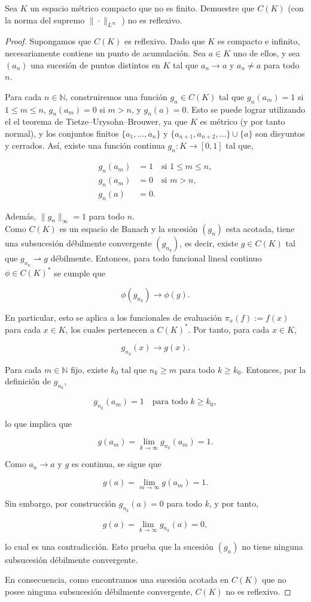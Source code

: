  Sea $K$ un espacio métrico compacto que no es finito. Demuestre que $C(K)$ (con la norma del supremo $\|\cdot\|_{L^{\infty}}$ ) no es reflexivo.
 \begin{proof}
Supongamos que \( C(K) \) es reflexivo. Dado que $K$ es compacto e infinito, necesariamente contiene un punto de acumulación. Sea $a \in K$ uno de ellos, y sea $(a_n)$ una sucesión de puntos distintos en $K$ tal que $a_n \to a$ y $a_n \neq a$ para todo $n$.

Para cada $n \in \mathbb{N}$, construiremos una función $g_n \in C(K)$ tal que $g_n(a_m) = 1$ si $1 \leq m \leq n$, $g_n(a_m) = 0$ si $m > n$, y $g_n(a) = 0$. Esto se puede lograr utilizando el el teorema de Tietze–Urysohn–Brouwer, ya que $K$ es métrico (y por tanto normal), y los conjuntos finitos $\{a_1, \dots, a_n\}$ y $\{a_{n+1}, a_{n+2}, \dots\} \cup \{a\}$ son disyuntos y cerrados. Así, existe una función continua $g_n : K \to [0,1]$ tal que,

\begin{align*}
  g_n(a_m) &= 1 \quad \text{si } 1 \leq m \leq n, \\
  g_n(a_m) &= 0 \quad \text{si } m > n, \\
  g_n(a)   &= 0.
\end{align*}

Además, $\|g_n\|_\infty = 1$ para todo $n$. \\
Como \( C(K) \) es un espacio de Banach y la sucesión $(g_n)$ esta acotada, tiene una subsucesión débilmente convergente $(g_{n_k})$, es decir, existe $g \in C(K)$ tal que $g_{n_k} \rightharpoonup g$ débilmente. Entonces, para todo funcional lineal continuo $\phi \in C(K)^*$ se cumple que

\[
\phi(g_{n_k}) \to \phi(g).
\]

En particular, esto se aplica a los funcionales de evaluación $\pi_x(f) := f(x)$ para cada $x \in K$, los cuales pertenecen a $C(K)^*$. Por tanto, para cada $x \in K$,

\[
g_{n_k}(x) \to g(x).
\]

Para cada $m \in \mathbb{N}$ fijo, existe $k_0$ tal que $n_k \geq m$ para todo $k \geq k_0$. Entonces, por la definición de $g_{n_k}$,

\[
g_{n_k}(a_m) = 1 \quad \text{para todo } k \geq k_0,
\]

lo que implica que

\[
g(a_m) = \lim_{k \to \infty} g_{n_k}(a_m) = 1.
\]

Como $a_n \to a$ y $g$ es continua, se sigue que

\[
g(a) = \lim_{m \to \infty} g(a_m) = 1.
\]

Sin embargo, por construcción $g_{n_k}(a) = 0$ para todo $k$, y por tanto,

\[
g(a) = \lim_{k \to \infty} g_{n_k}(a) = 0,
\]

lo cual es una contradicción. Esto prueba que la sucesión $(g_n)$ no tiene ninguna subsucesión débilmente convergente.

En consecuencia, como encontramos una sucesión acotada en \( C(K) \) que no posee ninguna subsucesión débilmente convergente, \( C(K) \) no es reflexivo.

\end{proof}